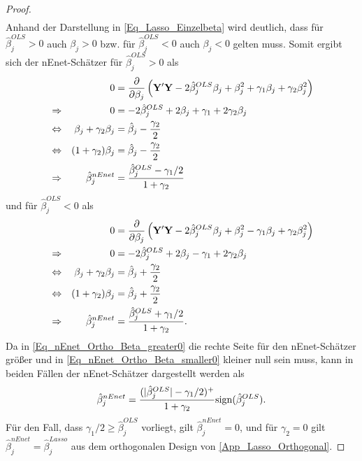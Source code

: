 \documentclass[12pt, a4paper]{report}\usepackage[]{graphicx}\usepackage[]{color}
\begin{document}
\begin{appendix}
\begin{proof}
\begin{align}
\end{align}
Anhand der Darstellung in \eqref{Eq_Lasso_Einzelbeta} wird deutlich, dass für $\hat{\beta}_j^{OLS}>0$  auch $\beta_j > 0$ bzw. für $\hat{\beta}_j^{OLS}<0$ auch $\beta_j < 0$ gelten muss. Somit ergibt sich der nEnet-Schätzer für $\hat{\beta}_j^{OLS}>0$ als
\begin{align}\label{Eq_nEnet_Ortho_Beta_greater0}
&& 0&=\frac{\partial}{\partial \beta_j} \left( \mathbf{Y}'\mathbf{Y} -2\hat{\beta}_j^{OLS}  \beta_j + \beta_j^2 + \gamma_1 \beta_j + \gamma_2 \beta_j^2 \right) \notag \\
&\Rightarrow& 0&=-2\hat{\beta}_j^{OLS} + 2\beta_j + \gamma_1 + 2\gamma_2 \beta_j \notag \\
&\Leftrightarrow& \beta_j + \gamma_2 \beta_j &=\hat{\beta}_j - \frac{\gamma_2}{2} \notag \\
&\Leftrightarrow& (1 + \gamma_2) \beta_j &=\hat{\beta}_j - \frac{\gamma_2}{2} \notag \\
&\Rightarrow& \hat{\beta}_j^{nEnet}&=\frac{\hat{\beta}_j^{OLS}-\gamma_1 /2}{1 + \gamma_2} 
\end{align}
und für $\hat{\beta}_j^{OLS}<0$ als
\begin{align}\label{Eq_nEnet_Ortho_Beta_smaller0}
&& 0&=\frac{\partial}{\partial \beta_j} \left( \mathbf{Y}'\mathbf{Y} -2\hat{\beta}_j^{OLS}  \beta_j + \beta_j^2 - \gamma_1 \beta_j + \gamma_2 \beta_j^2 \right) \notag \\
&\Rightarrow& 0&=-2\hat{\beta}_j^{OLS} + 2\beta_j - \gamma_1 + 2\gamma_2 \beta_j \notag \\
&\Leftrightarrow& \beta_j + \gamma_2 \beta_j &=\hat{\beta}_j + \frac{\gamma_2}{2} \notag \\
&\Leftrightarrow& (1 + \gamma_2) \beta_j &=\hat{\beta}_j + \frac{\gamma_2}{2} \notag \\
&\Rightarrow& \hat{\beta}_j^{nEnet}&=\frac{\hat{\beta}_j^{OLS}+\gamma_1 /2}{1 + \gamma_2} .
\end{align}
Da in \eqref{Eq_nEnet_Ortho_Beta_greater0} die rechte Seite für den nEnet-Schätzer größer und in \eqref{Eq_nEnet_Ortho_Beta_smaller0} kleiner null sein muss, kann in beiden Fällen der nEnet-Schätzer dargestellt werden als
\begin{align}\label{Eq_nEnet_Orthogonaldarstellung}
\hat{\beta}_j^{nEnet}=\frac{(|\hat{\beta}_j^{OLS}|- \gamma_1 /2)^+}{1+\gamma_2}\textnormal{sign}(\hat{\beta}_j^{OLS}). 
\end{align}
Für den Fall, dass $\gamma_1 /2 \geq \hat{\beta}_j^{OLS}$ vorliegt, gilt $\hat{\beta}_j^{nEnet}=0$, und für $\gamma_2 = 0$ gilt $\hat{\beta}_j^{nEnet}=\hat{\beta}_j^{Lasso}$ aus dem orthogonalen Design von \ref{App_Lasso_Orthogonal}.
\end{proof}


\end{appendix}
\end{document}
